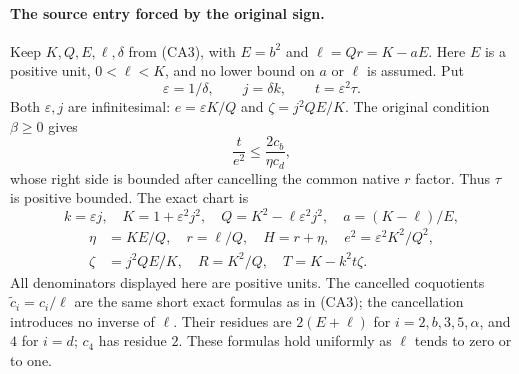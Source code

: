 \paragraph{The source entry forced by the original sign.}
Keep $K,Q,E,\ell,\delta$ from (CA3), with $E=b^2$ and
$\ell=Qr=K-aE$. Here $E$ is a positive unit, $0<\ell<K$, and no lower
bound on $a$ or $\ell$ is assumed. Put
\[
 \varepsilon=1/\delta,\qquad j=\delta k,\qquad t=\varepsilon^2\tau.
\]
Both $\varepsilon,j$ are infinitesimal: $e=\varepsilon K/Q$ and
$\zeta=j^2QE/K$. The original condition $\beta\ge0$ gives
\[
 \frac{t}{e^2}\le\frac{2c_b}{\eta c_d},
\]
whose right side is bounded after cancelling the common native $r$
factor. Thus $\tau$ is positive bounded. The exact chart is
\[
 k=\varepsilon j,\quad K=1+\varepsilon^2j^2,\quad
 Q=K^2-\ell\varepsilon^2j^2,\quad a=(K-\ell)/E,
\]
\begin{align*}
 \eta&=KE/Q,\quad r=\ell/Q,\quad H=r+\eta,\quad
 e^2=\varepsilon^2K^2/Q^2,\\
 \zeta&=j^2QE/K,\quad R=K^2/Q,\quad T=K-k^2t\zeta. \tag{SE1}
\end{align*}
All denominators displayed here are positive units. The cancelled
coquotients $\widetilde c_i=c_i/\ell$ are the same short exact formulas
as in (CA3); the cancellation introduces no inverse of $\ell$.
Their residues are $2(E+\ell)$ for $i=2,b,3,5,\alpha$, and $4$ for
$i=d$; $c_4$ has residue $2$. These formulas hold uniformly as
$\ell$ tends to zero or to one.

